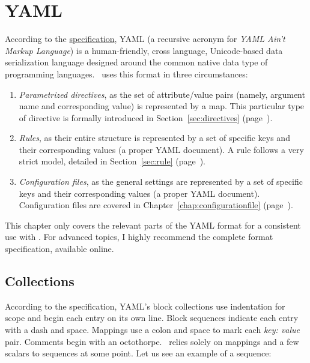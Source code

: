 \chapter{YAML}
\label{chap:yaml}

According to the \href{http://yaml.org/spec/1.2/spec.html}{specification}, YAML (a recursive acronym for \emph{YAML Ain't Markup Language}) is a human-friendly, cross language, Unicode-based data serialization language designed around the common native data type of programming languages. \arara\ uses this format in three circumstances:

\begin{enumerate}
\item\emph{Parametrized directives}, as the set of attribute/value pairs (namely, argument name and corresponding value) is represented by a map. This particular type of directive is formally introduced in Section~\ref{sec:directives} (page~\pageref{sec:directives}).

\item\emph{Rules}, as their entire structure is represented by a set of specific keys and their corresponding values (a proper YAML document). A rule follows a very strict model, detailed in Section~\ref{sec:rule} (page~\pageref{sec:rule}).

\item\emph{Configuration files}, as the general settings are represented by a set of specific keys and their corresponding values (a proper YAML document). Configuration files are covered in Chapter~\ref{chap:configurationfile} (page~\pageref{chap:configurationfile}).
\end{enumerate}

This chapter only covers the relevant parts of the YAML format for a consistent use with \arara. For advanced topics, I highly recommend the complete format specification, available online.

\section{Collections}
\label{sec:yamlcollections}

According to the specification, YAML's block collections use indentation for scope and begin each entry on its own line. Block sequences indicate each entry with a dash and space. Mappings use a colon and space to mark each \emph{key: value} pair. Comments begin with an octothorpe. \arara\ relies solely on mappings and a few scalars to sequences at some point. Let us see an example of a sequence:

